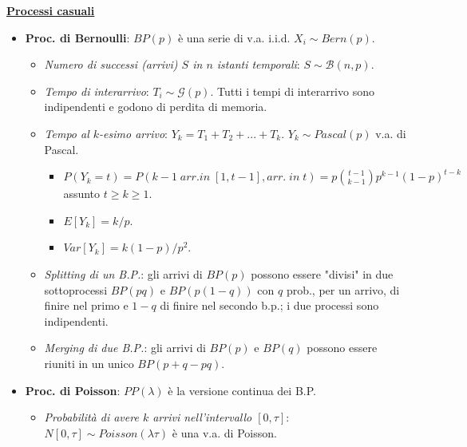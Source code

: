 \documentclass[8pt]{extarticle}
\begin{document}
\begin{multicols*}{3}
    \textbf{\underline{Processi casuali}}
    \begin{itemize}
        \item \textbf{Proc. di Bernoulli}: $BP(p)$ è una serie di v.a. i.i.d. $X_{i}\sim Bern(p)$.
              \begin{itemize}
                  \item \textit{Numero di successi (arrivi) $S$ in $n$ istanti temporali}: $S\sim\mathcal{B}(n,p)$.
                  \item \textit{Tempo di interarrivo}: $T_{i}\sim\mathcal{G}(p)$. Tutti i tempi di interarrivo sono indipendenti e godono di perdita di memoria.
                  \item \textit{Tempo al $k$-esimo arrivo}: $Y_{k}=T_{1}+T_{2}+...+T_{k}$. $Y_{k}\sim Pascal(p)$ v.a. di Pascal.
                        \begin{itemize}
                            \item $P(Y_{k}=t)=P(k-1\; arr. in\; [1, t-1], arr.\; in\; t)=p\binom{t-1}{k-1}p^{k-1}(1-p)^{t-k}$ assunto $t\ge k\ge 1$.
                            \item $E[Y_{k}]=k/p$.
                            \item $Var[Y_{k}]=k(1-p)/p^{2}$.
                        \end{itemize}
                  \item \textit{Splitting di un B.P.}: gli arrivi di $BP(p)$ possono essere "divisi" in due sottoprocessi $BP(pq)$ e $BP(p(1-q))$ con $q$ prob., per un arrivo, di finire nel primo e $1-q$ di finire nel secondo b.p.; i due processi sono indipendenti.
                  \item \textit{Merging di due B.P.}: gli arrivi di $BP(p)$ e $BP(q)$ possono essere riuniti in un unico $BP(p+q-pq)$.
              \end{itemize}
        \item \textbf{Proc. di Poisson}: $PP(\lambda)$ è la versione continua dei B.P.
              \begin{itemize}
                  \item \textit{Probabilità di avere $k$ arrivi nell'intervallo $[0, \tau]$}:  $N[0, \tau]\sim Poisson(\lambda\tau)$ è una v.a. di Poisson.
\end{itemize}
\end{itemize}
\end{multicols*}
\end{document}
